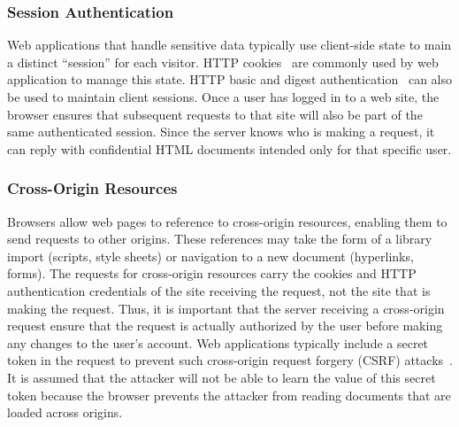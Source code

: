 \documentclass{acm_proc_article-sp}
\begin{document}
\subsubsection{Session Authentication}
Web applications that handle sensitive data typically use client-side state to
main a distinct ``session'' for each visitor. HTTP cookies~\cite{rfc2109,
httpstate} are commonly used by web application to manage this state. HTTP
basic and digest authentication~\cite{rfc2617} can also be used to maintain
client sessions. Once a user has logged in to a web site, the browser ensures
that subsequent requests to that site will also be part of the same
authenticated session. Since the server knows who is making a request, it can
reply with confidential HTML documents intended only for that specific user.

\subsubsection{Cross-Origin Resources}
Browsers allow web pages to reference to cross-origin resources, enabling them to send requests to other origins. These references may take the form of a library import (scripts, style sheets) or navigation to a new document (hyperlinks, forms). The requests for cross-origin resources carry the cookies and HTTP authentication credentials of the site receiving the request, not the site that is making the request. Thus, it is important that the server receiving a cross-origin request ensure that the request is actually authorized by the user before making any changes to the user's account. Web applications typically include a secret token in the request to prevent such cross-origin request forgery (CSRF) attacks~\cite{csrf}. It is assumed that the attacker will not be able to learn the value of this secret token because the browser prevents the attacker from reading documents that are loaded across origins.


%
%
%
%
%
%
\end{document}
